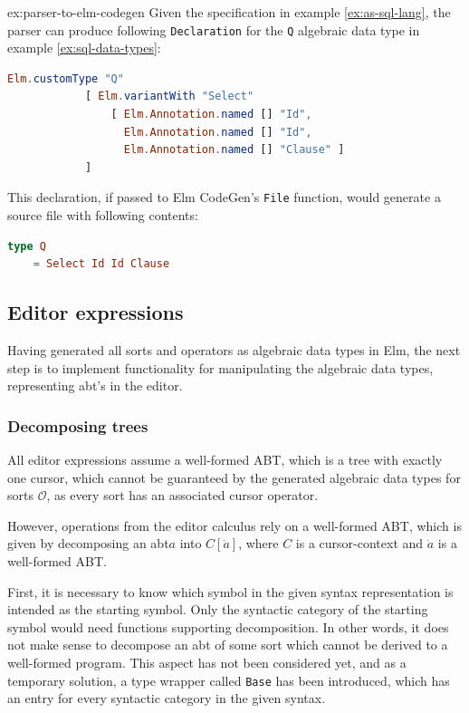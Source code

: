\documentclass[sigplan,review]{acmart}
\newcommand{\abt}{\textsf{abt}\xspace}
\begin{document}
\begin{example}{ex:parser-to-elm-codegen}
  Given the specification in example \cref{ex:as-sql-lang}, the parser can produce following \texttt{Declaration} for the \texttt{Q} algebraic data type in example \cref{ex:sql-data-types}:
  \begin{lstlisting}[language=elm]
Elm.customType "Q"
            [ Elm.variantWith "Select" 
                [ Elm.Annotation.named [] "Id", 
                  Elm.Annotation.named [] "Id", 
                  Elm.Annotation.named [] "Clause" ]
            ]
\end{lstlisting}

  This declaration, if passed to Elm CodeGen's \texttt{File} function, would generate a source file with following contents:
  \begin{lstlisting}[language=elm]
type Q
    = Select Id Id Clause
\end{lstlisting}
\end{example}

\subsection{Editor expressions}

Having generated all sorts and operators as algebraic data types in Elm,
the next step is to implement functionality for manipulating the algebraic
data types, representing {\abt}'s in the editor.

\subsubsection{Decomposing trees}

All editor expressions assume a well-formed ABT, which is a tree
with exactly one cursor, which cannot be guaranteed by the generated
algebraic data types for sorts $\mathcal{O}$, as every sort has an associated cursor operator.

However, operations from the editor calculus rely on a well-formed ABT, which is given
by decomposing an \abt $a$ into $C[\dot{a}]$, where $C$ is a
cursor-context and $\dot{a}$ is a
well-formed ABT.

First, it is necessary to know which symbol in the given syntax representation
is intended as the starting symbol. Only the syntactic category of the starting symbol
would need functions supporting decomposition.
In other words, it does not make sense to decompose an \abt of some sort which
cannot be derived to a well-formed program.
This aspect has not been considered yet, and as a temporary solution,
a type wrapper called \texttt{Base} has been introduced, which has an entry for
every syntactic category in the given syntax.
\end{document}
